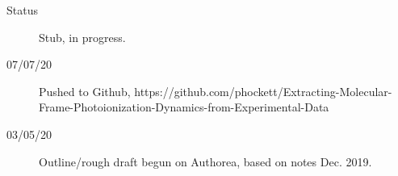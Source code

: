 \begin{description}
\item [{Status}] Stub, in progress.
\item [{07/07/20}] Pushed to Github, \href{http://}{}https://github.com/phockett/Extracting-Molecular-Frame-Photoionization-Dynamics-from-Experimental-Data
\item [{03/05/20}] Outline/rough draft begun on Authorea, based on notes Dec. 2019.
\end{description}